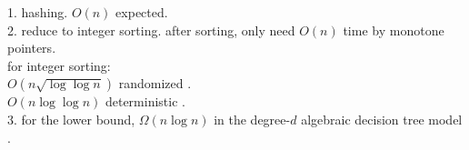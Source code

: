 \documentclass{article}
\newcommand{\Acknowledgements}[1]{\ \\{\bf Acknowledgements:} #1}
\begin{document}

1. hashing. $O(n)$ expected.\\


2. reduce to integer sorting. after sorting, only need $O(n)$ time by monotone pointers.\\
for integer sorting:\\
$O(n\sqrt{\log\log n})$ randomized \cite{han2002sorting}.\\
$O(n\log \log n)$ deterministic \cite{han2002deterministic}.\\

3. for the lower bound, $\Omega(n\log n)$ in the degree-$d$ algebraic decision tree model \cite{Chan2004RefinedUA}.\\







\end{document}
